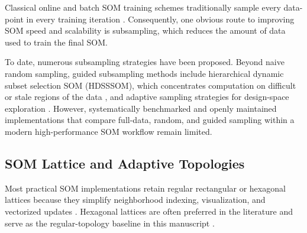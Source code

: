 \documentclass[11pt]{article}
\begin{document}
Classical online and batch SOM training schemes traditionally sample every data-point in every training iteration \citep{kohonenSelfOrganizingMaps2001,liuRobustPhenotypingHighly2023}. Consequently, one obvious route to improving SOM speed and scalability is subsampling, which reduces the amount of data used to train the final SOM.

To date, numerous subsampling strategies have been proposed. Beyond naive random sampling, guided subsampling methods include hierarchical dynamic subset selection SOM (HDSSSOM), which concentrates computation on difficult or stale regions of the data \citep{wetmoreSpeedingSelfOrganizingFeature2005}, and adaptive sampling strategies for design-space exploration \citep{itoDesignSpaceExploration2016}. However, systematically benchmarked and openly maintained implementations that compare full-data, random, and guided sampling within a modern high-performance SOM workflow remain limited.

\subsection{SOM Lattice and Adaptive Topologies}

Most practical SOM implementations retain regular rectangular or hexagonal lattices because they simplify neighborhood indexing, visualization, and vectorized updates \citep{kohonenSelforganizingMap1990,kohonenEssentialsSelforganizingMap2013}. Hexagonal lattices are often preferred in the literature and serve as the regular-topology baseline in this manuscript \citep{whiteTopologyMattersNetwork2008,kohonenEssentialsSelforganizingMap2013,forestSurveyImplementationPerformance2020}.
\end{document}
